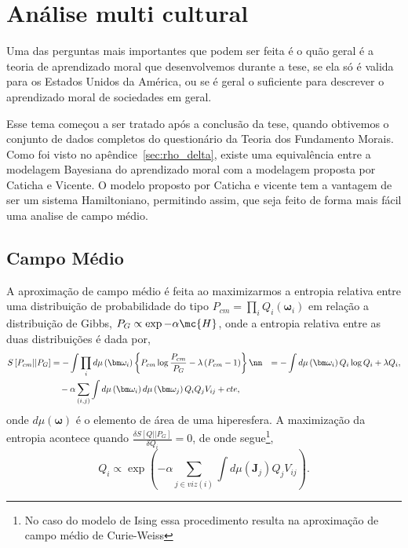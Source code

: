 \chapter{Análise multi cultural}

Uma das perguntas mais importantes que podem ser feita é o quão geral é  a teoria
de aprendizado moral que desenvolvemos durante a tese, se ela só é valida para
os Estados Unidos da América, ou se é geral o suficiente para descrever o
aprendizado moral de sociedades em geral.

Esse tema começou a ser tratado após a conclusão da tese, quando obtivemos o
conjunto de dados completos do questionário da Teoria dos Fundamento
Morais\citep{Quest}.
Como foi visto no apêndice~\ref{sec:rho_delta}, existe uma equivalência
entre a modelagem Bayesiana do aprendizado moral com a modelagem proposta
por Caticha e Vicente\citep{Caticha2011a}. O modelo proposto por Caticha e
vicente tem a vantagem de ser um sistema Hamiltoniano, permitindo assim, que
seja feito de forma mais fácil uma analise de campo médio.

\section{Campo Médio}

A aproximação de campo médio é feita ao maximizarmos a entropia
relativa entre uma distribuição de probabilidade do tipo $P_{cm}=\prod_i
Q_i(\bm \omega_i)$ em relação a distribuição de Gibbs\cite{Opper2001},
$P_G \propto \exp -\alpha \mc{H}$, onde a entropia relativa entre as duas
distribuições é dada por,
\begin{align}
    S\left[P_{cm}||P_G\right] &= - \int \prod_i d \mu \left(\bm \omega_i\right)
    \left\{ P_{cm}\log\frac{P_{cm}}{P_G} - \lambda\left(P_{cm} -1\right)\right\}
    \nn
    &= -\int d \mu \left(\bm \omega_i\right) Q_i\log Q_i +
        \lambda Q_i, \nonumber \\
        &\quad  - \alpha\sum_{\left(i,j\right)}\int d \mu
        \left(\bm \omega_i\right) d \mu
\left(\bm \omega_j\right)Q_iQ_jV_{ij} + cte,
\end{align}
onde $d\mu(\bm \omega)$ é o elemento de área de uma hiperesfera. A maximização
da entropia acontece quando $\frac{\delta S\left[Q||P_G\right]}{\delta Q_i}
= 0$, de onde segue\footnote{No caso do modelo de Ising essa procedimento
resulta na aproximação de campo médio de Curie-Weiss\citep{Opper2001}},
\begin{equation}
Q_i \propto \exp \left( -\alpha \sum_{j \in viz\left(i\right)} \int d
        \mu \left(\bm{J}_j\right) Q_jV_{ij} \right)\nonumber.
\end{equation}

